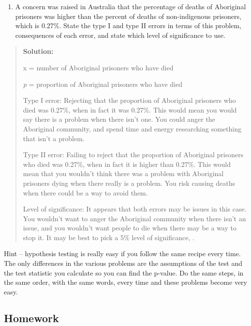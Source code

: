 \documentclass[]{book}
\providecommand{\tightlist}{%
  \setlength{\itemsep}{0pt}\setlength{\parskip}{0pt}}
\begin{document}
\begin{enumerate}
\def\labelenumi{\alph{enumi}.}
\setcounter{enumi}{1}
\tightlist
\item
  A concern was raised in Australia that the percentage of deaths of
  Aboriginal prisoners was higher than the percent of deaths of
  non-indigenous prisoners, which is 0.27\%. State the type I and type
  II errors in terms of this problem, consequences of each error, and
  state which level of significance to use.
\end{enumerate}

\begin{quote}
\textbf{Solution:}

x = number of Aboriginal prisoners who have died

\emph{p} = proportion of Aboriginal prisoners who have died

Type I error: Rejecting that the proportion of Aboriginal prisoners
who died was 0.27\%, when in fact it was 0.27\%. This would mean you
would say there is a problem when there isn't one. You could anger the
Aboriginal community, and spend time and energy researching something
that isn't a problem.

Type II error: Failing to reject that the proportion of Aboriginal
prisoners who died was 0.27\%, when in fact it is higher than 0.27\%.
This would mean that you wouldn't think there was a problem with
Aboriginal prisoners dying when there really is a problem. You risk
causing deaths when there could be a way to avoid them.

Level of significance: It appears that both errors may be issues in
this case. You wouldn't want to anger the Aboriginal community when
there isn't an issue, and you wouldn't want people to die when there
may be a way to stop it. It may be best to pick a 5\% level of
significance, .
\end{quote}

Hint -- hypothesis testing is really easy if you follow the same recipe
every time. The only differences in the various problems are the
assumptions of the test and the test statistic you calculate so you can
find the p-value. Do the same steps, in the same order, with the same
words, every time and these problems become very easy.

\hypertarget{homework-20}{%
\subsection{Homework}\label{homework-20}}
\end{document}
